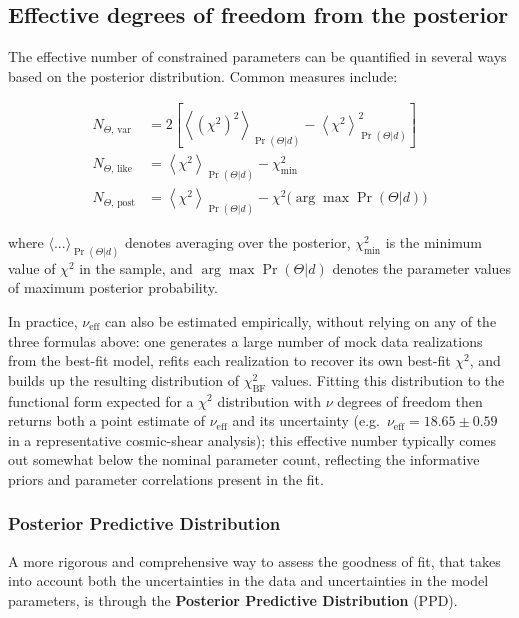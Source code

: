 \subsection{Effective degrees of freedom from the posterior}

The effective number of constrained parameters can be quantified in several ways based on the posterior distribution. Common measures include:

\begin{align*}
N_{\Theta,\,\mathrm{var}} &= 2 \left[ \left\langle (\chi^2)^2 \right\rangle_{\Pr(\Theta|d)} - \left\langle \chi^2 \right\rangle_{\Pr(\Theta|d)}^2 \right] \\[1em]
N_{\Theta,\,\mathrm{like}} &= \left\langle \chi^2 \right\rangle_{\Pr(\Theta|d)} - \chi^2_{\min} \\[1em]
N_{\Theta,\,\mathrm{post}} &= \left\langle \chi^2 \right\rangle_{\Pr(\Theta|d)} - \chi^2 \big(\arg\max \Pr(\Theta|d)\big)
\end{align*}

where $\langle ... \rangle_{\Pr(\Theta|d)}$ denotes averaging over the posterior, $\chi^2_{\min}$ is the minimum value of $\chi^2$ in the sample, and $\arg\max \Pr(\Theta|d)$ denotes the parameter values of maximum posterior probability.

In practice, $\nu_{\text{eff}}$ can also be estimated empirically, without relying on any of the three formulas above: one generates a large number of mock data realizations from the best-fit model, refits each realization to recover its own best-fit $\chi^2$, and builds up the resulting distribution of $\chi^2_{\text{BF}}$ values. Fitting this distribution to the functional form expected for a $\chi^2$ distribution with $\nu$ degrees of freedom then returns both a point estimate of $\nu_{\text{eff}}$ and its uncertainty (e.g.\ $\nu_{\text{eff}} = 18.65 \pm 0.59$ in a representative cosmic-shear analysis); this effective number typically comes out somewhat below the nominal parameter count, reflecting the informative priors and parameter correlations present in the fit.

\subsubsection{Posterior Predictive Distribution}

A more rigorous and comprehensive way to assess the goodness of fit, that takes into account both the uncertainties in the data and uncertainties in the model parameters, is through the \textbf{Posterior Predictive Distribution} (PPD).

